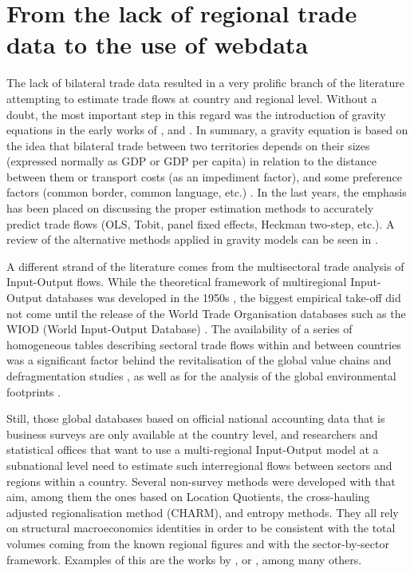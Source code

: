 \documentclass[]{interact}
\theoremstyle{plain}%
\theoremstyle{definition}
\theoremstyle{remark}
\begin{document}
\hypertarget{sec:2}{%
\section{From the lack of regional trade data to the use of
webdata}\label{sec:2}}

The lack of bilateral trade data resulted in a very prolific branch of
the literature attempting to estimate trade flows at country and
regional level. Without a doubt, the most important step in this regard
was the introduction of gravity equations in the early works of
\citet{tinbergen1962shaping}, \citet{linnemann1966econometric} and
\citet{leamer1r}. In summary, a gravity equation is based on the idea
that bilateral trade between two territories depends on their sizes
(expressed normally as GDP or GDP per capita) in relation to the
distance between them or transport costs (as an impediment factor), and
some preference factors (common border, common language, etc.)
\citep{egger2002econometric, anderson2003gravity}. In the last years,
the emphasis has been placed on discussing the proper estimation methods
to accurately predict trade flows (OLS, Tobit, panel fixed effects,
Heckman two-step, etc.). A review of the alternative methods applied in
gravity models can be seen in \citet{gomez2013comparing}.

A different strand of the literature comes from the multisectoral trade
analysis of Input-Output flows. While the theoretical framework of
multiregional Input-Output databases was developed in the 1950s
\citep{isard1956location}, the biggest empirical take-off did not come
until the release of the World Trade Organisation databases such as the
WIOD (World Input-Output Database)
\citep{dietzenbacher2013construction}. The availability of a series of
homogeneous tables describing sectoral trade flows within and between
countries was a significant factor behind the revitalisation of the
global value chains and defragmentation studies
\citep{timmer2015illustrated, los2015global, los2016tracing, antras2018measurement},
as well as for the analysis of the global environmental footprints
\citep{arto2014comparing, owen2016explaining}.

Still, those global databases based on official national accounting data
that is business surveys are only available at the country level, and
researchers and statistical offices that want to use a multi-regional
Input-Output model at a subnational level need to estimate such
interregional flows between sectors and regions within a country.
Several non-survey methods were developed with that aim, among them the
ones based on Location Quotients, the cross-hauling adjusted
regionalisation method (CHARM), and entropy methods. They all rely on
structural macroeconomics identities in order to be consistent with the
total volumes coming from the known regional figures and with the
sector-by-sector framework. Examples of this are the works by
\citet{sargento2012inter}, \citet{tobben2015construction} or
\citet{boero2018regional}, among many others.
\end{document}
